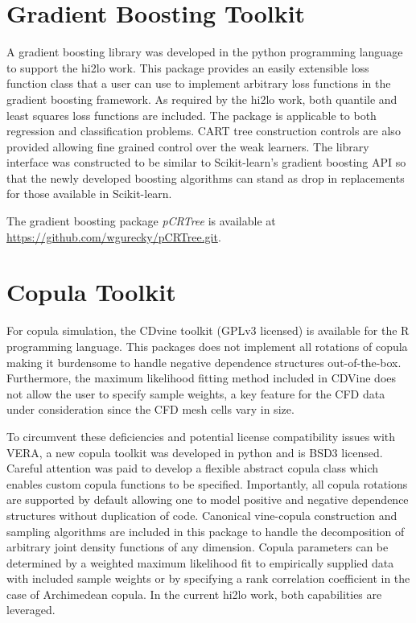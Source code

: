 
\section{Gradient Boosting Toolkit}

A gradient boosting library was developed in the python programming language to support the hi2lo work.  This package provides an easily extensible loss function class that a user can use to implement arbitrary loss functions in the gradient boosting framework.  As required by the hi2lo work, both quantile and least squares loss functions are included.  The package is applicable to both regression and classification problems.  CART tree construction controls are also provided allowing fine grained control over the weak learners.
The library interface was constructed to be similar to Scikit-learn's gradient boosting API so that the newly developed boosting algorithms can stand as drop in replacements for those available in Scikit-learn.

The gradient boosting package \emph{pCRTree} is available at \url{https://github.com/wgurecky/pCRTree.git}.

\section{Copula Toolkit}

For copula simulation, the CDvine toolkit (GPLv3 licensed) is available for the R programming language. This packages does not implement all rotations of copula making it burdensome to handle negative dependence structures out-of-the-box.  Furthermore, the maximum likelihood fitting method included in CDVine does not allow the user to specify sample weights, a key feature for the CFD data under consideration since the CFD mesh cells vary in size.

To circumvent these deficiencies and potential license compatibility issues with VERA, a new copula toolkit was developed in python and is BSD3 licensed.
Careful attention was paid to develop a flexible abstract copula class which enables custom copula functions to be specified.  Importantly, all copula rotations are supported by default allowing one to model positive and negative dependence structures without duplication of code.
Canonical vine-copula construction and sampling algorithms are included in this package to handle the decomposition of arbitrary joint density functions of any dimension.
Copula parameters can be determined by a weighted maximum likelihood fit to empirically supplied data with included sample weights or by specifying a rank correlation coefficient in the case of Archimedean copula.  In the current hi2lo work, both capabilities are leveraged.


